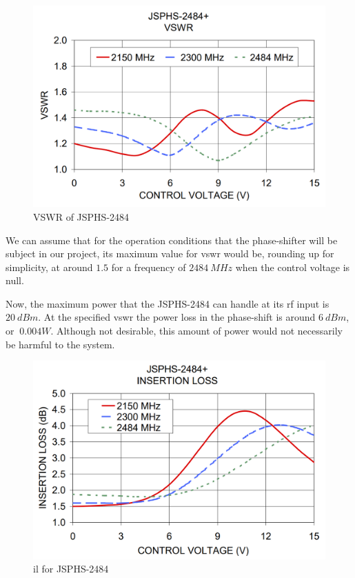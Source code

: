 \begin{figure}[H]
    \vspace*{0cm}
    \centering
    \includegraphics[width=0.6\linewidth]{figs/ch3_JSPHS-2484+VSWR.png}
    \caption{VSWR of JSPHS-2484 \cite{PhaseJSPHS-2484+}}
    \label{fig:ch3_JSPHS-2484+VSWR.png}
\end{figure}

\par We can assume that for the operation conditions that the phase-shifter will be subject in our project, its maximum value for \ac{vswr} would be, rounding up for simplicity, at around $1.5$ for a frequency of $2484 \:\si{MHz}$ when the control voltage is null.

\par Now, the maximum power that the JSPHS-2484 can handle at its \ac{rf} input is $ 20 \:\si{dBm}$.  At the specified \ac{vswr} the power loss in the phase-shift is around $6 \:\si{dBm}$, or $\:\si{0.004W}$. Although not desirable, this amount of power would not necessarily be harmful to the system.

\begin{figure}[H]
    \vspace*{0cm}
    \centering
    \includegraphics[width=0.6\linewidth]{figs/ch3_JSPHS-2484+INSERTION_LOSS.png}
    \caption{\ac{il} for JSPHS-2484 \cite{PhaseJSPHS-2484+}}
    \label{fig:ch3_JSPHS-2484+INSERTION_LOSS.png}
\end{figure}

